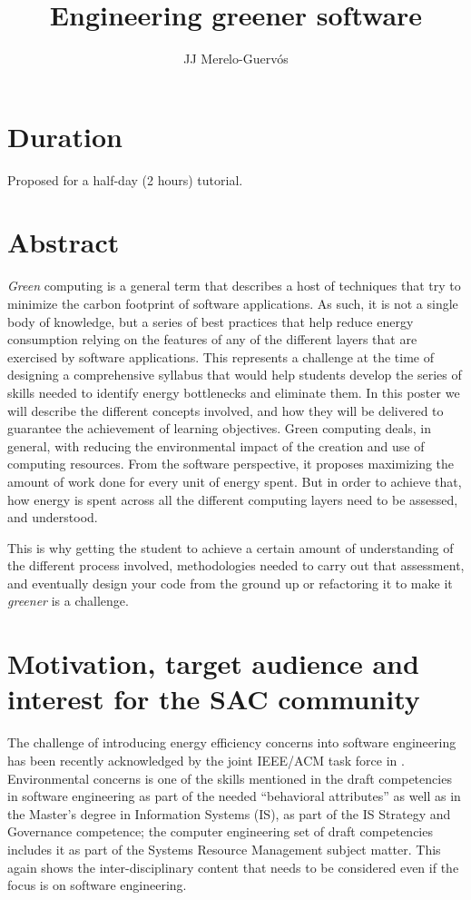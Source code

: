 \documentclass[a4paper]{article}
\begin{document}
\title{Engineering greener software}

\author{JJ Merelo-Guervós}


\maketitle

\section{Duration}

Proposed for a half-day (2 hours) tutorial.

\section{Abstract}

{\em Green} computing is a general term that describes a host of techniques that
try to minimize the carbon footprint of software applications. As such, it is
not a single body of knowledge, but a series of best practices that help reduce
energy consumption relying on the features of any of the different layers that
are exercised by software applications. This represents a challenge at the
time of designing a comprehensive syllabus that would help students develop the
series of skills needed to identify energy bottlenecks and eliminate them. In
this poster we will describe the different concepts involved, and how they will
be delivered to guarantee the achievement of learning objectives.
Green computing \cite{kurp2008green} deals, in general, with reducing the
environmental impact of the creation and use of computing resources. From the
software perspective, it proposes maximizing the amount of work done for every
unit of energy spent. But in order to achieve that, how energy is spent across
all the different computing layers need to be assessed, and understood.

This is why getting the student to achieve a certain amount of understanding of
the different process involved, methodologies needed to carry out that
assessment, and eventually design your code from the ground up or refactoring it
to make it {\em greener} is a challenge.

\section{Motivation, target audience and interest for the SAC community}

The challenge of introducing energy efficiency concerns into software
engineering has been recently acknowledged by the joint IEEE/ACM task force in
\cite{cc2020}. Environmental concerns is one of the skills mentioned in the
draft competencies in software engineering as part of the needed ``behavioral
attributes'' as well as in the Master's degree in Information Systems (IS), as
part of the IS Strategy and Governance competence; the computer engineering set
of draft competencies includes it as part of the Systems Resource Management
subject matter. This again shows the inter-disciplinary content that needs to be
considered even if the focus is on software engineering.
\end{document}
